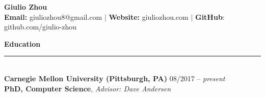 \documentclass{article}
\begin{document}
\newcommand{\HRule}{\rule{\linewidth}{0.2mm}}


\begin{center}
\textbf{{\LARGE Giulio Zhou}} \\ \vspace{1mm}
\textbf{\fontsize{11}{13.2} Email:} giuliozhou8@gmail.com  $|$ \textbf{Website:} giuliozhou.com $|$ \textbf{GitHub}: github.com/giulio-zhou\\[2mm]
\end{center}


\normalsize
\noindent
\textbf{{\Large Education}}\\[-2mm]
\HRule\\
\textbf{Carnegie Mellon University (Pittsburgh, PA)}
\hfill 08/2017 -- \textit{present} \\
\indent
\textbf{PhD, Computer Science}, \textit{Advisor: Dave Andersen}\\
\vspace{-3.5mm}
\end{document}
